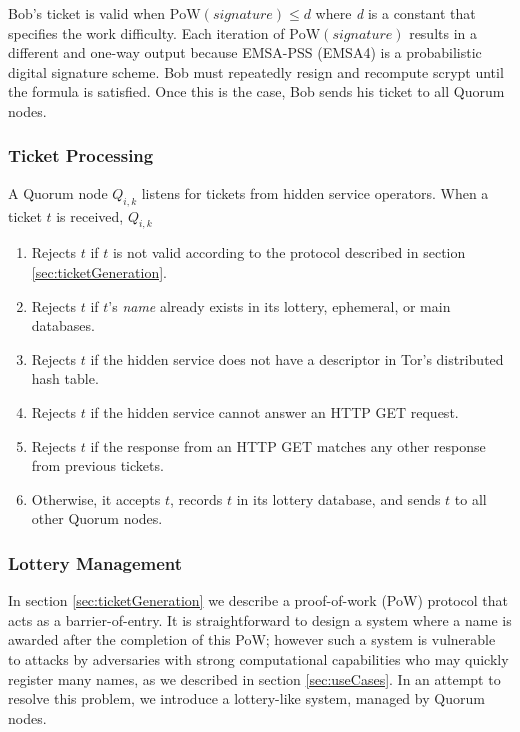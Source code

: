 \documentclass[USenglish,oneside,twocolumn]{article}
\begin{document}
Bob's ticket is valid when $ \mathrm{PoW}(\mathit{signature}) \leq d $ where \emph{d} is a constant that specifies the work difficulty. Each iteration of $ \mathrm{PoW}(\mathit{signature}) $ results in a different and one-way output because EMSA-PSS (EMSA4) is a probabilistic digital signature scheme. Bob must repeatedly resign and recompute scrypt until the formula is satisfied. Once this is the case, Bob sends his ticket to all Quorum nodes.

\subsubsection{Ticket Processing}

A Quorum node $ Q_{i,k} $ listens for tickets from hidden service operators. When a ticket $ t $ is received, $ Q_{i,k} $

\begin{enumerate}
	\item Rejects $ t $ if $ t $ is not valid according to the protocol described in section \ref{sec:ticketGeneration}.
	\item Rejects $ t $ if $ t $'s \emph{name} already exists in its lottery, ephemeral, or main databases.
	\item Rejects $ t $ if the hidden service does not have a descriptor in Tor's distributed hash table.
	\item Rejects $ t $ if the hidden service cannot answer an HTTP GET request.
	\item Rejects $ t $ if the response from an HTTP GET matches any other response from previous tickets.
	\item Otherwise, it accepts $ t $, records $ t $ in its lottery database, and sends $ t $ to all other Quorum nodes.
\end{enumerate}

\subsubsection{Lottery Management}

In section \ref{sec:ticketGeneration} we describe a proof-of-work (PoW) protocol that acts as a barrier-of-entry. It is straightforward to design a system where a name is awarded after the completion of this PoW; however such a system is vulnerable to attacks by adversaries with strong computational capabilities who may quickly register many names, as we described in section \ref{sec:useCases}. In an attempt to resolve this problem, we introduce a lottery-like system, managed by Quorum nodes.
\end{document}
